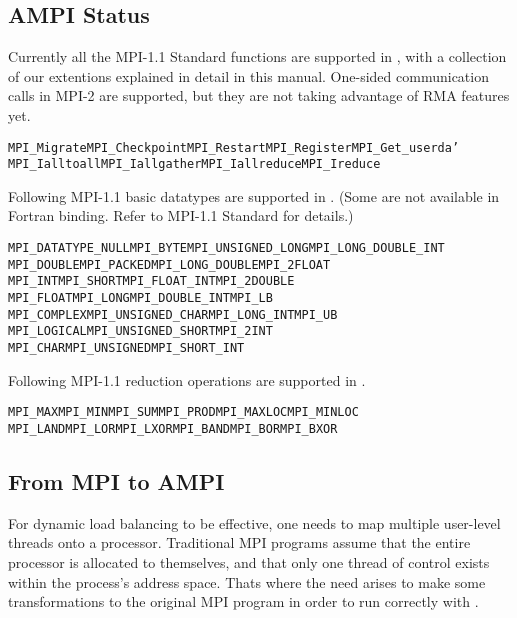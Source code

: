 \documentclass[10pt]{article}
\begin{document}
\subsection{AMPI Status}

Currently all the MPI-1.1 Standard functions are supported in \ampi{}, with a
collection of our extentions explained in detail in this manual. One-sided
communication calls in MPI-2 are supported, but they are not taking advantage
of RMA features yet.

\begin{alltt}
MPI_Migrate	MPI_Checkpoint	MPI_Restart	MPI_Register	MPI_Get_userda	'
MPI_Ialltoall	MPI_Iallgather	MPI_Iallreduce	MPI_Ireduce
\end{alltt}

Following MPI-1.1 basic datatypes are supported in \ampi{}. (Some are not available in
Fortran binding. Refer to MPI-1.1 Standard for details.)
\begin{alltt}
MPI_DATATYPE_NULL  MPI_BYTE            MPI_UNSIGNED_LONG MPI_LONG_DOUBLE_INT
MPI_DOUBLE         MPI_PACKED          MPI_LONG_DOUBLE   MPI_2FLOAT
MPI_INT            MPI_SHORT           MPI_FLOAT_INT     MPI_2DOUBLE
MPI_FLOAT          MPI_LONG            MPI_DOUBLE_INT    MPI_LB
MPI_COMPLEX        MPI_UNSIGNED_CHAR   MPI_LONG_INT      MPI_UB
MPI_LOGICAL        MPI_UNSIGNED_SHORT  MPI_2INT
MPI_CHAR           MPI_UNSIGNED        MPI_SHORT_INT
\end{alltt}

Following MPI-1.1 reduction operations are supported in \ampi{}.

\begin{alltt}
MPI_MAX   MPI_MIN   MPI_SUM   MPI_PROD  MPI_MAXLOC  MPI_MINLOC
MPI_LAND  MPI_LOR   MPI_LXOR  MPI_BAND  MPI_BOR     MPI_BXOR
\end{alltt}

\subsection{From MPI to AMPI}

For dynamic load balancing to be effective, one needs to map multiple
user-level threads onto a processor. Traditional MPI programs assume that the
entire processor is allocated to themselves, and that only one thread of
control exists within the process's address space.  Thats where the need arises
to make some transformations to the original MPI program in order to run
correctly with \ampi{}.
\end{document}
